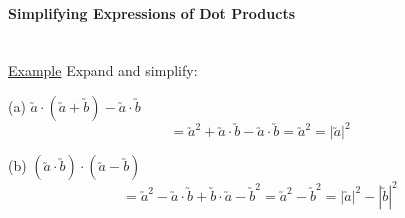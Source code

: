 \documentclass[a4paper]{article}
\begin{document}
				\paragraph{Simplifying Expressions of Dot Products}\mbox{}\\
					\underline{Example}\newline
					Expand and simplify:\newline
					\begin{minipage}{0.5\textwidth}
						(a) $\utilde{a}\cdot(\utilde{a}+\utilde{b})-\utilde{a}\cdot\utilde{b}$\newline
						\[
						=\utilde{a}^2+\utilde{a}\cdot\utilde{b}-\utilde{a}\cdot\utilde{b}=\utilde{a}^2=|\utilde{a}|^2
						\]
					\end{minipage}
					\hfill
					\begin{minipage}{0.5\textwidth}
						(b) $(\utilde{a}\cdot\utilde{b})\cdot(\utilde{a}-\utilde{b})$\newline
						\[
						=\utilde{a}^2-\utilde{a}\cdot\utilde{b}+\utilde{b}\cdot\utilde{a}-\utilde{b}^2=\utilde{a}^2-\utilde{b}^2=|\utilde{a}|^2-|\utilde{b}|^2
						\]
					\end{minipage}
\end{document}
